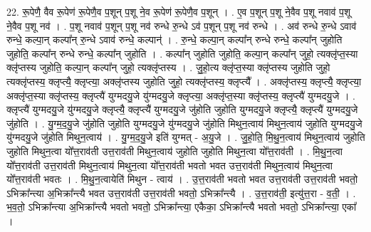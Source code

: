 \documentclass[17pt]{extarticle}
\begin{document}
22. रू॒पेणै॒ वैव रू॒पेण॑ रू॒पेणै॒व प॒शून् प॒शू ने॒व रू॒पेण॑ रू॒पेणै॒व प॒शून् । . ए॒व प॒शून् प॒शू ने॒वैव प॒शू नवाव॑ प॒शू ने॒वैव प॒शू नव॑ । . प॒शू नवाव॑ प॒शून् प॒शू नव॑ रुन्धे रु॒न्धे ऽव॑ प॒शून् प॒शू नव॑ रुन्धे । . अव॑ रुन्धे रु॒न्धे ऽवाव॑ रुन्धे॒ कल्पा॒न् कल्पा᳚न् रु॒न्धे ऽवाव॑ रुन्धे॒ कल्पान्॑ । . रु॒न्धे॒ कल्पा॒न् कल्पा᳚न् रुन्धे रुन्धे॒ कल्पा᳚न् जुहोति जुहोति॒ कल्पा᳚न् रुन्धे रुन्धे॒ कल्पा᳚न् जुहोति । . कल्पा᳚न् जुहोति जुहोति॒ कल्पा॒न् कल्पा᳚न् जुहो॒ त्यक्लृ॑प्त॒स्या क्लृ॑प्तस्य जुहोति॒ कल्पा॒न् कल्पा᳚न् जुहो॒ त्यक्लृ॑प्तस्य । . जु॒हो॒त्य क्लृ॑प्त॒स्या क्लृ॑प्तस्य जुहोति जुहो॒ त्यक्लृ॑प्तस्य॒ क्लृप्त्यै॒ क्लृप्त्या॒ अक्लृ॑प्तस्य जुहोति जुहो॒
त्यक्लृ॑प्तस्य॒ क्लृप्त्यै᳚ । . अक्लृ॑प्तस्य॒ क्लृप्त्यै॒ क्लृप्त्या॒ अक्लृ॑प्त॒स्या क्लृ॑प्तस्य॒ क्लृप्त्यै॑ युग्मदयु॒जे यु॑ग्मदयु॒जे क्लृप्त्या॒ अक्लृ॑प्त॒स्या क्लृ॑प्तस्य॒ क्लृप्त्यै॑ युग्मदयु॒जे । . क्लृप्त्यै॑ युग्मदयु॒जे यु॑ग्मदयु॒जे क्लृप्त्यै॒ क्लृप्त्यै॑ युग्मदयु॒जे जु॑होति जुहोति युग्मदयु॒जे क्लृप्त्यै॒ क्लृप्त्यै॑ युग्मदयु॒जे जु॑होति । . यु॒ग्म॒द॒यु॒जे जु॑होति जुहोति युग्मदयु॒जे यु॑ग्मदयु॒जे जु॑होति मिथुन॒त्वाय॑ मिथुन॒त्वाय॑ जुहोति युग्मदयु॒जे यु॑ग्मदयु॒जे जु॑होति मिथुन॒त्वाय॑ । . यु॒ग्म॒द॒यु॒जे इति॑ युग्मत् - अ॒यु॒जे । . जु॒हो॒ति॒ मि॒थु॒न॒त्वाय॑ मिथुन॒त्वाय॑ जुहोति जुहोति मिथुन॒त्वा यो᳚त्त॒राव॑ती उत्त॒राव॑ती मिथुन॒त्वाय॑ जुहोति जुहोति मिथुन॒त्वा यो᳚त्त॒राव॑ती । . मि॒थु॒न॒त्वा यो᳚त्त॒राव॑ती उत्त॒राव॑ती मिथुन॒त्वाय॑ मिथुन॒त्वा यो᳚त्त॒राव॑ती भवतो भवत उत्त॒राव॑ती मिथुन॒त्वाय॑ मिथुन॒त्वा यो᳚त्त॒राव॑ती भवतः । . मि॒थु॒न॒त्वायेति॑ मिथुन - त्वाय॑ । . उ॒त्त॒राव॑ती भवतो भवत उत्त॒राव॑ती उत्त॒राव॑ती भवतो॒ ऽभिक्रा᳚न्त्या अ॒भिक्रा᳚न्त्यै भवत उत्त॒राव॑ती उत्त॒राव॑ती भवतो॒ ऽभिक्रा᳚न्त्यै । . उ॒त्त॒राव॑ती॒ इत्यु॑त्त॒रा - व॒ती॒ । . भ॒व॒तो॒ ऽभिक्रा᳚न्त्या अ॒भिक्रा᳚न्त्यै भवतो भवतो॒ ऽभिक्रा᳚न्त्या॒ एकैका॒ ऽभिक्रा᳚न्त्यै भवतो भवतो॒ ऽभिक्रा᳚न्त्या॒ एका᳚ । \newline
\end{document}
